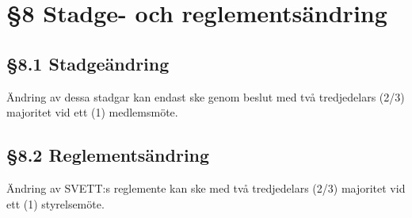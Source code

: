 \section*{\S8 Stadge- och reglementsändring}

\subsection*{\S8.1 Stadgeändring}
{}

Ändring av dessa stadgar kan endast ske genom beslut med två tredjedelars (2/3)
majoritet vid ett (1) medlemsmöte.

\subsection*{\S8.2 Reglementsändring}

Ändring av SVETT:s reglemente kan ske med två tredjedelars (2/3) majoritet vid ett
(1) styrelsemöte.

